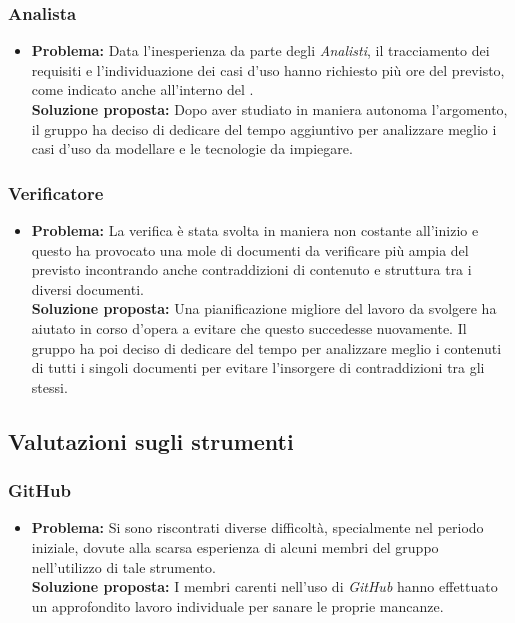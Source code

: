 \subsubsection{Analista}
\begin{itemize}
	\item \textbf{Problema:} Data l'inesperienza da parte degli \textit{Analisti}, il tracciamento dei requisiti e l'individuazione dei casi d'uso hanno richiesto più ore del previsto, come indicato anche all'interno del \textit{}.\\
	\textbf{Soluzione proposta:} Dopo aver studiato in maniera autonoma l'argomento, il gruppo ha deciso di dedicare del tempo aggiuntivo per analizzare meglio i casi d’uso da modellare e le tecnologie da impiegare.	
\end{itemize}

\subsubsection{Verificatore}
\begin{itemize}
	\item \textbf{Problema:} La verifica è stata svolta in maniera non costante all'inizio e questo ha provocato una mole di documenti da verificare più ampia del previsto incontrando anche contraddizioni di contenuto e struttura tra i diversi documenti.\\
	\textbf{Soluzione proposta:} Una pianificazione migliore del lavoro da svolgere ha aiutato in corso d’opera a evitare che questo succedesse nuovamente. Il gruppo ha poi deciso di dedicare del tempo per analizzare meglio i contenuti di tutti i singoli documenti per evitare l’insorgere di contraddizioni tra gli stessi.	
\end{itemize}

\subsection{Valutazioni sugli strumenti}
\subsubsection{GitHub}
\begin{itemize}
	\item \textbf{Problema:} Si sono riscontrati diverse difficoltà, specialmente nel periodo iniziale, dovute alla scarsa esperienza di alcuni membri del gruppo nell'utilizzo di tale strumento.\\
	\textbf{Soluzione proposta:} I membri carenti nell'uso di \textit{GitHub} hanno effettuato un approfondito lavoro individuale per sanare le proprie mancanze.
\end{itemize}
